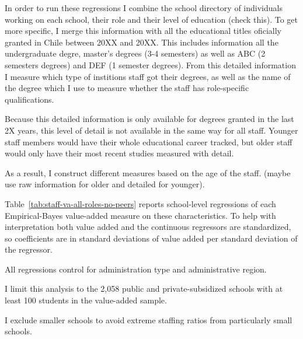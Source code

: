 \documentclass[a4paper, article, english, oneside, unknownkeysallowed, 12pt]{memoir}
\begin{document}




In order to run these regressions I combine the school directory of individuals working on each school, their role and their level of education (check this).
To get more specific, I merge this information with all the educational titles oficially granted in Chile between 20XX and 20XX. 
This includes information all the undergraduate degre, master's degrees (3-4 semesters) as well as  ABC (2 semesters degrees) and  DEF (1 semester degrees). 
From this detailed information I measure which type of institions staff got their degrees, as well as the name of the degree which I use to measure whether the staff has role-specific qualifications.

Because this detailed information is only available for degrees granted in the last 2X years, this level of detail is not available in the same way for all staff.
Younger staff members would have their whole educational career tracked, but older staff would only have their most recent studies measured with detail.

As a result, I construct different measures based on the age of the staff. 
(maybe use raw information for older and detailed for younger). 





Table~\ref{tab:staff-va-all-roles-no-peers} reports school-level regressions of each Empirical-Bayes value-added measure on these characteristics.
To help with interpretation both value added and the continuous regressors are standardized, so coefficients are in standard deviations of value added per standard deviation of the regressor.

All regressions control for administration type and administrative region.


I limit this analysis to the 2,058 public and private-subsidized schools with at least 100 students in the value-added sample.

I exclude smaller schools to avoid extreme staffing ratios from particularly small schools.


%
%
%
%

\end{document}
